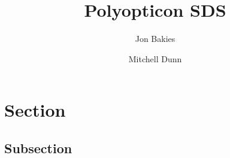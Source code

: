 \documentclass[12pt]{article}
\begin{document}
\title{Polyopticon SDS}
\author{Jon Bakies \and Mitchell Dunn} 

\maketitle
\newpage

\tableofcontents
\newpage

\section{Section}
\subsection {Subsection} 
\paragraph{}



\end{document}
